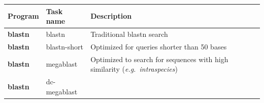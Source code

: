 \documentclass[11pt]{article}
\begin{document}
\begin{longtable}[]{@{}lll@{}}
\hline
\begin{minipage}[b]{0.30\columnwidth}\raggedright
\textbf{Program}\strut
\end{minipage} & \begin{minipage}[b]{0.30\columnwidth}\raggedright
\textbf{Task name}\strut
\end{minipage} & \begin{minipage}[b]{0.30\columnwidth}\raggedright
\textbf{Description}\strut
\end{minipage}\tabularnewline
\hline
\endhead
\begin{minipage}[t]{0.30\columnwidth}\raggedright
\textbf{blastn}\strut
\end{minipage} & \begin{minipage}[t]{0.30\columnwidth}\raggedright
blastn\strut
\end{minipage} & \begin{minipage}[t]{0.30\columnwidth}\raggedright
Traditional blastn search\strut
\end{minipage}\tabularnewline
\begin{minipage}[t]{0.30\columnwidth}\raggedright
\textbf{blastn}\strut
\end{minipage} & \begin{minipage}[t]{0.30\columnwidth}\raggedright
blastn-short\strut
\end{minipage} & \begin{minipage}[t]{0.30\columnwidth}\raggedright
Optimized for queries shorter than 50 bases\strut
\end{minipage}\tabularnewline
\begin{minipage}[t]{0.30\columnwidth}\raggedright
\textbf{blastn}\strut
\end{minipage} & \begin{minipage}[t]{0.30\columnwidth}\raggedright
megablast\strut
\end{minipage} & \begin{minipage}[t]{0.30\columnwidth}\raggedright
Optimized to search for sequences with high similarity
(\textit{e.g.~intraspecies})\strut
\end{minipage}\tabularnewline
\begin{minipage}[t]{0.30\columnwidth}\raggedright
\textbf{blastn}\strut
\end{minipage} & \begin{minipage}[t]{0.30\columnwidth}\raggedright
dc-megablast\strut
\end{minipage} & \begin{minipage}[t]{0.30\columnwidth}\raggedright

\end{minipage}
\end{longtable}
\end{document}
